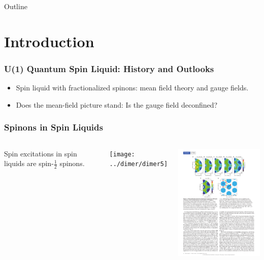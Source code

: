 \documentclass[xcolor=table, 10pt, aspectratio=43]{beamer}
\begin{document}
\begin{frame}{Outline}
		\tableofcontents
\end{frame}

\section{Introduction}

\begin{frame}
  \frametitle{U(1) Quantum Spin Liquid: History and Outlooks}
\begin{itemize}
  \item Spin liquid with fractionalized spinons: mean field theory and gauge fields.
  \item Does the mean-field picture stand: Is the gauge field deconfined?
\end{itemize}
\end{frame}

\begin{frame}
  \frametitle{Spinons in Spin Liquids}
  \begin{columns}
    Spin excitations in spin liquids are spin-$\frac12$ spinons.
    \begin{center}
      \texttt{[image: ../dimer/dimer5]}
    \end{center}
    \begin{center}
      \includegraphics[width=7cm]{../resources/ymgo-neutron}
    \end{center}
  \end{columns}
\end{frame}
\end{document}
